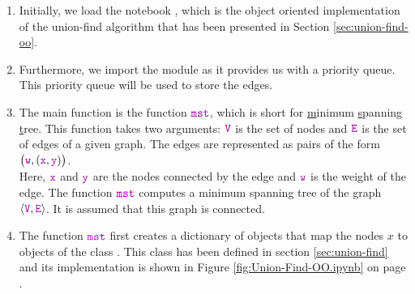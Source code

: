 \begin{enumerate}
\item Initially, we load the notebook , which is the object oriented 
      implementation of the union-find algorithm that has been presented in Section \ref{sec:union-find-oo}.
\item Furthermore, we import the module  as it provides us with a priority queue.  This priority
      queue will be used to store the edges.
\item The main function is the function $\mytt{mst}$, which is short for \underline{m}inimum
      \underline{s}panning \underline{t}ree.  This function takes two arguments:
      $\mytt{V}$ is the set of nodes and $\mytt{E}$ is the set of edges of a given graph.  The edges are represented as
      pairs of the form
      \\[0.2cm]
      \hspace*{1.3cm}
      $\bigl(\mytt{w}, (\mytt{x}, \mytt{y})\bigr)$.
      \\[0.2cm] 
      Here, $\mytt{x}$ and $\mytt{y}$ are the nodes connected by the edge and $\mytt{w}$ is the
      weight of the edge.  The function $\mytt{mst}$ computes a minimum spanning tree of  the
      graph  $\pair(\mytt{V},\mytt{E})$.  It is assumed that this graph is connected.
\item The function $\mytt{mst}$ first creates a dictionary of  objects that map the nodes $x$ to
      objects of the class .  This class has been defined in section \ref{sec:union-find} and its
      implementation is shown in Figure \ref{fig:Union-Find-OO.ipynb} on page \pageref{fig:Union-Find-OO.ipynb}.


\end{enumerate}
